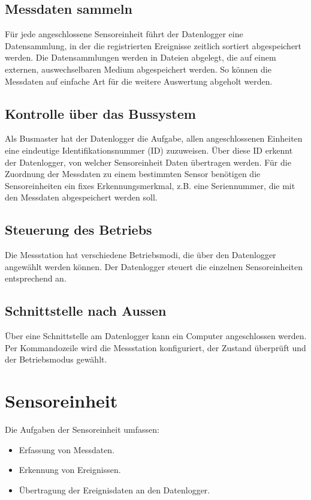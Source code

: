 \subsection{Messdaten sammeln}
Für jede angeschlossene Sensoreinheit führt der Datenlogger eine Datensammlung, in der die registrierten Ereignisse zeitlich sortiert abgespeichert werden. Die Datensammlungen werden in Dateien abgelegt, die auf einem externen, auswechselbaren Medium abgespeichert werden. So können die Messdaten auf einfache Art für die weitere Auswertung abgeholt werden.


\subsection{Kontrolle über das Bussystem}
Als Busmaster hat der Datenlogger die Aufgabe, allen angeschlossenen Einheiten eine eindeutige Identifikationsnummer (ID) zuzuweisen. Über diese ID erkennt der Datenlogger, von welcher Sensoreinheit Daten übertragen werden. Für die Zuordnung der Messdaten zu einem bestimmten Sensor benötigen die Sensoreinheiten ein fixes Erkennungsmerkmal, z.B. eine Seriennummer, die mit den Messdaten abgespeichert werden soll.


\subsection{Steuerung des Betriebs}
Die Messstation hat verschiedene Betriebsmodi, die über den Datenlogger angewählt werden können. Der Datenlogger steuert die einzelnen Sensoreinheiten entsprechend an.


\subsection{Schnittstelle nach Aussen}
Über eine Schnittstelle am Datenlogger kann ein Computer angeschlossen werden. Per Kommandozeile wird die Messstation konfiguriert, der Zustand überprüft und der Betriebsmodus gewählt.


\section{Sensoreinheit}
Die Aufgaben der Sensoreinheit umfassen:
\begin{itemize}
\item Erfassung von Messdaten.
\item Erkennung von Ereignissen.
\item Übertragung der Ereignisdaten an den Datenlogger.
\end{itemize}


